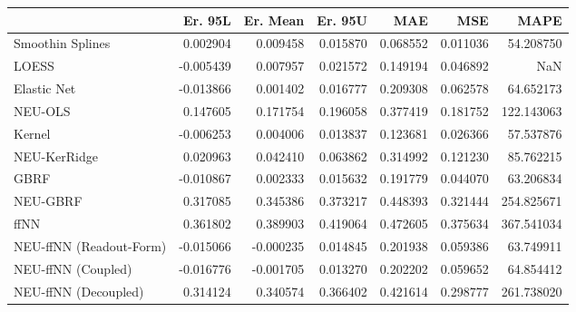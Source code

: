 \begin{tabular}{lrrrrrr}
\toprule
{} &   Er. 95L &  Er. Mean &   Er. 95U &       MAE &       MSE &        MAPE \\
\midrule
Smoothin Splines        &  0.002904 &  0.009458 &  0.015870 &  0.068552 &  0.011036 &   54.208750 \\
LOESS                   & -0.005439 &  0.007957 &  0.021572 &  0.149194 &  0.046892 &         NaN \\
Elastic Net             & -0.013866 &  0.001402 &  0.016777 &  0.209308 &  0.062578 &   64.652173 \\
NEU-OLS                 &  0.147605 &  0.171754 &  0.196058 &  0.377419 &  0.181752 &  122.143063 \\
Kernel                  & -0.006253 &  0.004006 &  0.013837 &  0.123681 &  0.026366 &   57.537876 \\
NEU-KerRidge            &  0.020963 &  0.042410 &  0.063862 &  0.314992 &  0.121230 &   85.762215 \\
GBRF                    & -0.010867 &  0.002333 &  0.015632 &  0.191779 &  0.044070 &   63.206834 \\
NEU-GBRF                &  0.317085 &  0.345386 &  0.373217 &  0.448393 &  0.321444 &  254.825671 \\
ffNN                    &  0.361802 &  0.389903 &  0.419064 &  0.472605 &  0.375634 &  367.541034 \\
NEU-ffNN (Readout-Form) & -0.015066 & -0.000235 &  0.014845 &  0.201938 &  0.059386 &   63.749911 \\
NEU-ffNN (Coupled)      & -0.016776 & -0.001705 &  0.013270 &  0.202202 &  0.059652 &   64.854412 \\
NEU-ffNN (Decoupled)    &  0.314124 &  0.340574 &  0.366402 &  0.421614 &  0.298777 &  261.738020 \\
\bottomrule
\end{tabular}

